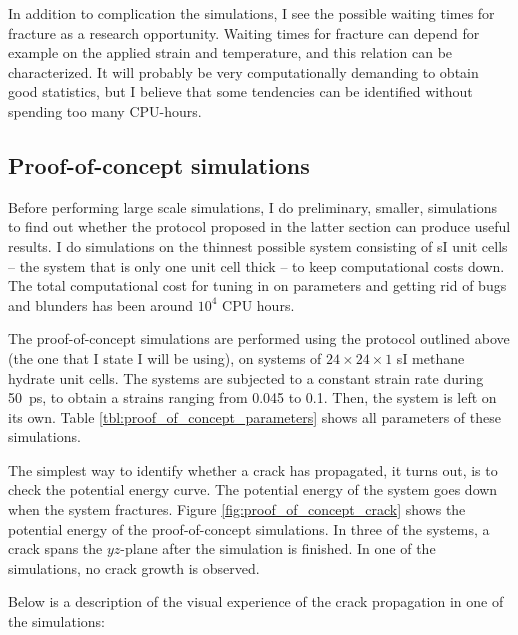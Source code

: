 In addition to complication the simulations, I see the possible waiting times for fracture as a research opportunity. Waiting times for fracture can depend for example on the applied strain and temperature, and this relation can be characterized. It will probably be very computationally demanding to obtain good statistics, but I believe that some tendencies can be identified without spending too many CPU-hours.

\subsection{Proof-of-concept simulations}
Before performing large scale simulations, I do preliminary, smaller, simulations to find out whether the protocol proposed in the latter section can produce useful results. I do simulations on the thinnest possible system consisting of sI unit cells -- the system that is only one unit cell thick -- to keep computational costs down. The total computational cost for tuning in on parameters and getting rid of bugs and blunders has been around $10^4$ CPU hours.

The proof-of-concept simulations are performed using the protocol outlined above (the one that I state I will be using), on systems of $24\times 24\times 1$ sI methane hydrate unit cells. The systems are subjected to a constant strain rate during \SI{50}{\pico\second}, to obtain a strains ranging from 0.045 to 0.1. Then, the system is left on its own. Table \ref{tbl:proof_of_concept_parameters} shows all parameters of these simulations.

The simplest way to identify whether a crack has propagated, it turns out, is to check the potential energy curve. The potential energy of the system goes down when the system fractures. Figure \ref{fig:proof_of_concept_crack} shows the potential energy of the proof-of-concept simulations. In three of the systems, a crack spans the $yz$-plane after the simulation is finished. In one of the simulations, no crack growth is observed.

Below is a description of the visual experience of the crack propagation in one of the simulations:

